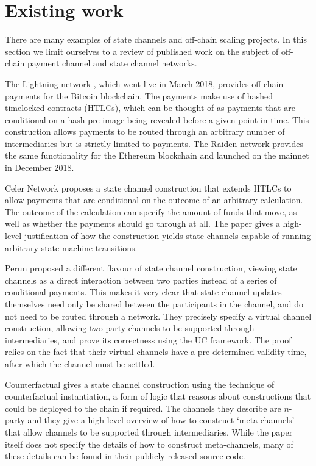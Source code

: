 \section{Existing work}

There are many examples of state channels and off-chain scaling projects. In this section we limit ourselves to a review of published work on the subject of off-chain payment channel and state channel networks.

The Lightning network \cite{lightning}, which went live in March 2018, provides off-chain payments for the Bitcoin blockchain.
The payments make use of hashed timelocked contracts (HTLCs), which can be thought of as payments that are conditional on a hash pre-image being revealed before a given point in time.
This construction allows payments to be routed through an arbitrary number of intermediaries but is strictly limited to payments.
The Raiden network \cite{raiden} provides the same functionality for the Ethereum blockchain and launched on the mainnet in December 2018.

Celer Network \cite{celer} proposes a state channel construction that extends HTLCs to allow payments that are conditional on the outcome of an arbitrary calculation.
The outcome of the calculation can specify the amount of funds that move, as well as whether the payments should go through at all.
The paper gives a high-level justification of how the construction yields state channels capable of running arbitrary state machine transitions.

Perun \cite{perun1, perun2} proposed a different flavour of state channel construction, viewing state channels as a direct interaction between two parties instead of a series of conditional payments.
This makes it very clear that state channel updates themselves need only be shared between the participants in the channel, and do not need to be routed through a network.
They precisely specify a virtual channel construction, allowing two-party channels to be supported through intermediaries, and prove its correctness using the UC framework.
The proof relies on the fact that their virtual channels have a pre-determined validity time, after which the channel must be settled.

Counterfactual \cite{counterfactual} gives a state channel construction using the technique of counterfactual instantiation, a form of logic that reasons about constructions that could be deployed to the chain if required.
The channels they describe are $n$-party and they give a high-level overview of how to construct `meta-channels' that allow channels to be supported through intermediaries.
While the paper itself does not specify the details of how to construct meta-channels, many of these details can be found in their publicly released source code.
